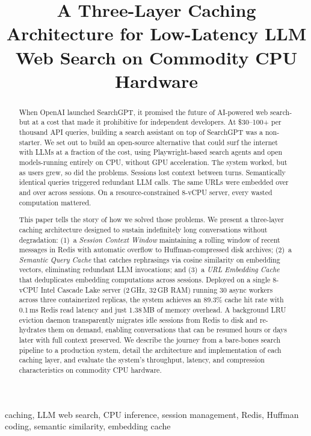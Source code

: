 \documentclass[conference]{IEEEtran}
\title{A Three-Layer Caching Architecture for Low-Latency LLM Web Search on Commodity CPU Hardware}
\author{
\IEEEauthorblockN{Ayushman Bhattacharya}
\IEEEauthorblockA{MyceliAI AÜ\\ayushman@myceli.ai}
}
\begin{document}
\maketitle

\begin{abstract}
When OpenAI launched SearchGPT, it promised the future of AI-powered web search-but at a cost that made it prohibitive for independent developers. At \$30--100+ per thousand API queries, building a search assistant on top of SearchGPT was a non-starter. We set out to build an open-source alternative that could surf the internet with LLMs at a fraction of the cost, using Playwright-based search agents and open models-running entirely on CPU, without GPU acceleration. The system worked, but as users grew, so did the problems. Sessions lost context between turns. Semantically identical queries triggered redundant LLM calls. The same URLs were embedded over and over across sessions. On a resource-constrained 8-vCPU server, every wasted computation mattered.

This paper tells the story of how we solved those problems. We present a three-layer caching architecture designed to sustain indefinitely long conversations without degradation: (1)~a \emph{Session Context Window} maintaining a rolling window of recent messages in Redis with automatic overflow to Huffman-compressed disk archives; (2)~a \emph{Semantic Query Cache} that catches rephrasings via cosine similarity on embedding vectors, eliminating redundant LLM invocations; and (3)~a \emph{URL Embedding Cache} that deduplicates embedding computations across sessions. Deployed on a single 8-vCPU Intel Cascade Lake server (2\,GHz, 32\,GB RAM) running 30 async workers across three containerized replicas, the system achieves an 89.3\% cache hit rate with 0.1\,ms Redis read latency and just 1.38\,MB of memory overhead. A background LRU eviction daemon transparently migrates idle sessions from Redis to disk and re-hydrates them on demand, enabling conversations that can be resumed hours or days later with full context preserved. We describe the journey from a bare-bones search pipeline to a production system, detail the architecture and implementation of each caching layer, and evaluate the system's throughput, latency, and compression characteristics on commodity CPU hardware.
\end{abstract}

\begin{IEEEkeywords}
caching, LLM web search, CPU inference, session management, Redis, Huffman coding, semantic similarity, embedding cache
\end{IEEEkeywords}
\end{document}
